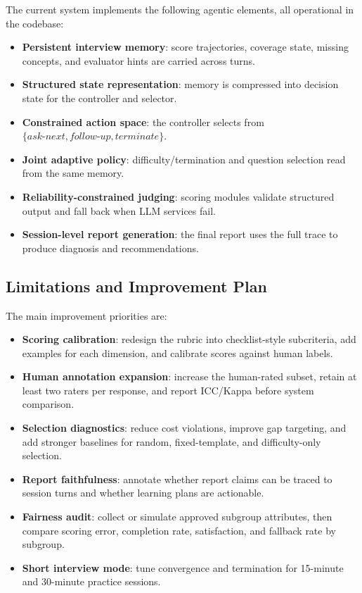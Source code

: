 ﻿\documentclass[final,3p,times,authoryear]{elsarticle}
\begin{document}
\noindent The current system implements the following agentic elements, all operational in the codebase:
\begin{itemize}
    \item \textbf{Persistent interview memory}: score trajectories, coverage state, missing concepts, and evaluator hints are carried across turns.
    \item \textbf{Structured state representation}: memory is compressed into decision state for the controller and selector.
    \item \textbf{Constrained action space}: the controller selects from $\{\textit{ask-next}, \textit{follow-up}, \textit{terminate}\}$.
    \item \textbf{Joint adaptive policy}: difficulty/termination and question selection read from the same memory.
    \item \textbf{Reliability-constrained judging}: scoring modules validate structured output and fall back when LLM services fail.
    \item \textbf{Session-level report generation}: the final report uses the full trace to produce diagnosis and recommendations.
\end{itemize}

\subsection{Limitations and Improvement Plan}

\noindent The main improvement priorities are:
\begin{itemize}
    \item \textbf{Scoring calibration}: redesign the rubric into checklist-style subcriteria, add examples for each dimension, and calibrate scores against human labels.
    \item \textbf{Human annotation expansion}: increase the human-rated subset, retain at least two raters per response, and report ICC/Kappa before system comparison.
    \item \textbf{Selection diagnostics}: reduce cost violations, improve gap targeting, and add stronger baselines for random, fixed-template, and difficulty-only selection.
    \item \textbf{Report faithfulness}: annotate whether report claims can be traced to session turns and whether learning plans are actionable.
    \item \textbf{Fairness audit}: collect or simulate approved subgroup attributes, then compare scoring error, completion rate, satisfaction, and fallback rate by subgroup.
    \item \textbf{Short interview mode}: tune convergence and termination for 15-minute and 30-minute practice sessions.
\end{itemize}
\end{document}
